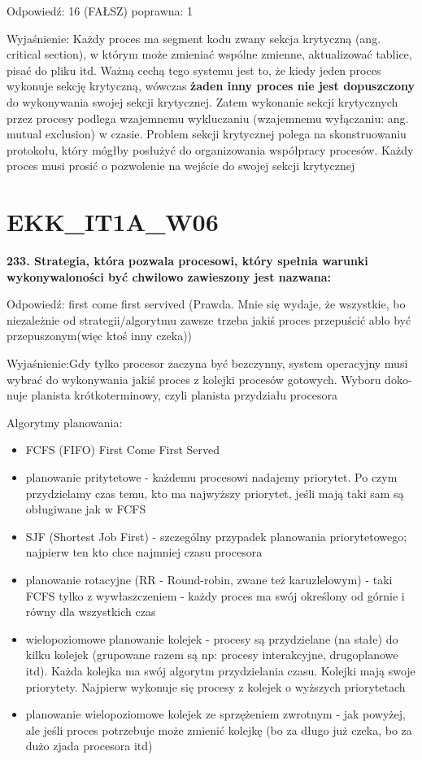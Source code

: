 \vspace{0.4cm}

Odpowiedź: 16 (FAŁSZ)
		poprawna: 1

Wyjaśnienie: Każdy proces ma segment kodu zwany sekcja krytyczną (ang. critical section), w którym może zmieniać wspólne zmienne, aktualizować tablice, pisać do pliku itd.
Ważną cechą tego systemu jest to, że kiedy jeden proces wykonuje sekcję krytyczną, wówczas \textbf{żaden inny proces nie jest dopuszczony} do wykonywania swojej sekcji krytycznej.
Zatem wykonanie sekcji krytycznych przez procesy podlega wzajemnemu wykluczaniu (wzajemnemu wyłączaniu: ang. mutual exclusion) w czasie.
Problem sekcji krytycznej polega na skonstruowaniu protokołu, który mógłby posłużyć do organizowania współpracy procesów.
Każdy proces musi prosić o pozwolenie na wejście do swojej sekcji krytycznej


\section{EKK\_IT1A\_W06}
\textbf{233. Strategia, która pozwala procesowi, który spełnia warunki wykonywaloności być chwilowo zawieszony jest nazwana:}

\vspace{0.4cm}

Odpowiedź: first come first servived (Prawda. Mnie się wydaje, że wszystkie, bo niezależnie od strategii/algorytmu zawsze trzeba jakiś proces przepuścić ablo być przepuszonym(więc ktoś inny czeka))


Wyjaśnienie:Gdy tylko procesor zaczyna być bezczynny, system operacyjny musi wybrać do wykonywania jakiś proces z kolejki procesów gotowych.
Wyboru doko-nuje planista krótkoterminowy, czyli planista przydziału procesora

Algorytmy planowania:
\begin{itemize}
	\item FCFS (FIFO) First Come First Served
	\item planowanie pritytetowe - każdemu procesowi nadajemy priorytet. Po czym przydzielamy czas temu, kto ma najwyższy priorytet, jeśli mają taki sam są obługiwane jak w FCFS
	\item SJF (Shortest Job First) - szczególny przypadek planowania priorytetowego; najpierw ten kto chce najmniej czasu procesora
	\item planowanie rotacyjne (RR - Round-robin, zwane też karuzlelowym) - taki FCFS tylko z wywłaszczeniem - każdy proces ma swój określony od górnie i równy dla wszystkich czas
	\item wielopoziomowe planowanie kolejek - procesy są przydzielane (na stałe) do kilku kolejek (grupowane razem są np: procesy interakcyjne, drugoplanowe itd).
	Każda kolejka ma swój algorytm przydzielania czasu. Kolejki mają swoje priorytety. Najpierw wykonuje się procesy z kolejek o wyższych priorytetach
	\item planowanie wielopoziomowe kolejek ze sprzężeniem zwrotnym - jak powyżej, ale jeśli proces potrzebuje może zmienić kolejkę (bo za długo już czeka, bo za dużo zjada procesora itd)


\end{itemize}

